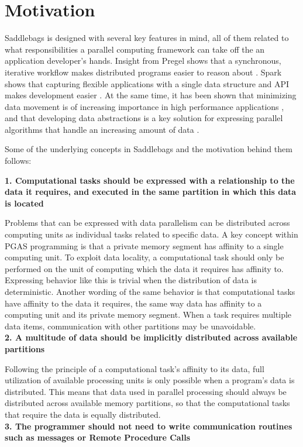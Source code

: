\documentclass{uit-report}
\begin{document}
\section{Motivation}
Saddlebags is designed with several key features in mind, all of them related to what responsibilities a parallel computing framework can take off the an application developer's hands. Insight from Pregel shows that a synchronous, iterative workflow makes distributed programs easier to reason about \cite{pregel}. Spark shows that capturing flexible applications with a single data structure and API makes development easier \cite{sparkarticle}. At the same time, it has been shown that minimizing data movement is of increasing importance in high performance applications \cite{abstractionslocality}, and that developing data  abstractions is a key solution for expressing parallel algorithms that handle an increasing amount of data \cite{hall2013rethinking}.

Some of the underlying concepts in Saddlebags and the motivation behind them follows:

\hspace{4ex} \textbf{1. Computational tasks should be expressed with a relationship to the data it requires, and executed in the same partition in which this data is located}

Problems that can be expressed with data parallelism can be distributed across computing units as individual tasks related to specific data. A key concept within PGAS programming is that a private memory segment has affinity to a single computing unit. To exploit data locality, a computational task should only be performed on the unit of computing which the data it requires has affinity to. Expressing behavior like this is trivial when the distribution of data is deterministic. Another wording of the same behavior is that computational tasks have affinity to the data it requires, the same way data has affinity to a computing unit and its private memory segment. When a task requires multiple data items, communication with other partitions may be unavoidable.
\\

\hspace{4ex} \textbf{2. A multitude of data should be implicitly distributed across available partitions}

Following the principle of a computational task's affinity to its data, full utilization of available processing units is only possible when a program's data is distributed. This means that data used in parallel processing should always be distributed across available memory partitions, so that the computational tasks that require the data is equally distributed.
\\	
\newpage
\hspace{4ex} \textbf{3. The programmer should not need to write communication routines such as messages or Remote Procedure Calls}
\end{document}
